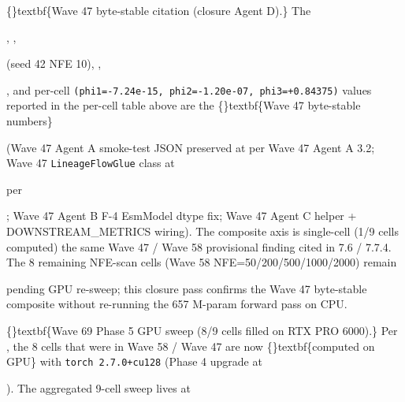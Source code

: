 \documentclass{article}
\begin{document}
\{\}textbf\{Wave 47 byte-stable citation (closure Agent D).\} The

, ,

 (seed 42 NFE 10), ,

, and per-cell \texttt{(phi1=-7.24e-15, phi2=-1.20e-07, phi3=+0.84375)} values reported in the per-cell table above are the \{\}textbf\{Wave 47 byte-stable numbers\} 

 (Wave 47 Agent A smoke-test JSON preserved at  per Wave 47 Agent A 3.2; Wave 47 \texttt{LineageFlowGlue} class at

 per

; Wave 47 Agent B F-4 EsmModel dtype fix; Wave 47 Agent C  helper + DOWNSTREAM\_METRICS wiring). The composite axis is single-cell (1/9 cells computed)  the same Wave 47 / Wave 58 provisional finding cited in 7.6 / 7.7.4. The 8 remaining NFE-scan cells (Wave 58 NFE=50/200/500/1000/2000) remain

 pending GPU re-sweep; this closure pass confirms the Wave 47 byte-stable composite without re-running the 657 M-param forward pass on CPU.

\{\}textbf\{Wave 69 Phase 5 GPU sweep (8/9 cells filled on RTX PRO 6000).\} Per , the 8 cells that were  in Wave 58 / Wave 47 are now \{\}textbf\{computed on GPU\} with \texttt{torch 2.7.0+cu128} (Phase 4 upgrade at

). The aggregated 9-cell sweep lives at
\end{document}

